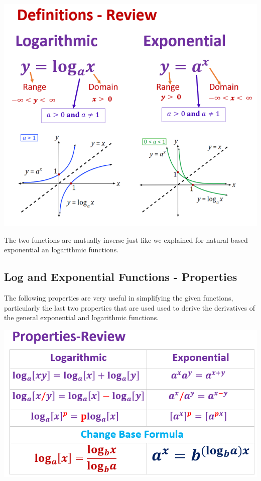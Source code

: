 \documentclass[
]{book}
\begin{document}
\begin{center}\includegraphics[width=0.7\linewidth]{img06/w06-GenLogExp-Def} \end{center}

The two functions are mutually inverse just like we explained for natural based exponential an logarithmic functions.

\hfill\break

\hypertarget{log-and-exponential-functions---properties}{%
\subsection{Log and Exponential Functions - Properties}\label{log-and-exponential-functions---properties}}

The following properties are very useful in simplifying the given functions, particularly the last two properties that are used used to derive the derivatives of the general exponential and logarithmic functions.

\hfill\break

\begin{center}\includegraphics[width=0.8\linewidth]{img06/w06-GenLogExp-Properties} \end{center}
\end{document}
